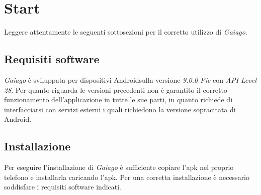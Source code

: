 \section{Start}
Leggere attentamente le seguenti sottosezioni per il corretto utilizzo di \textit{Gaiago}.
\subsection{Requisiti software}
\textit{Gaiago} è sviluppata per dispositivi Android\glosp sulla versione \textit{9.0.0 Pie} con \textit{API Level 28}. Per quanto riguarda le versioni precedenti non è garantito il corretto funzionamento dell'applicazione in tutte le sue parti, in quanto richiede di interfacciarsi con servizi esterni i quali richiedono la versione sopracitata di Android. 

\subsection{Installazione}
 Per eseguire l'installazione di \textit{Gaiago} è sufficiente copiare l'apk nel proprio telefono e installarla caricando l'apk.
 Per una corretta installazione è necessario soddisfare i requisiti software indicati.